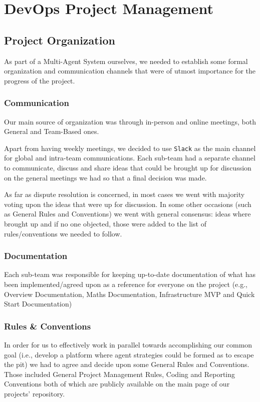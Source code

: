 \chapter{DevOps Project Management}\label{DevOps}

\section{Project Organization}

As part of a Multi-Agent System ourselves, we needed to establish some formal organization and communication channels that were of utmost importance for the progress of the project.

\subsection{Communication}

Our main source of organization was through in-person and online meetings, both General and Team-Based ones.

Apart from having weekly meetings, we decided to use \texttt{Slack} as the main channel for global and intra-team communications.
Each sub-team had a separate channel to communicate, discuss and share ideas that could be brought up for discussion on the general meetings we had so that a final decision was made.

As far as dispute resolution is concerned, in most cases we went with majority voting upon the ideas that were up for discussion. In some other occasions (such as General Rules and Conventions) we went with general consensus: ideas where brought up and if no one objected, those were added to the list of rules/conventions we needed to follow.

\subsection{Documentation}

Each sub-team was responsible for keeping up-to-date documentation of what has been implemented/agreed upon as a reference for everyone on the project (e.g., Overview Documentation, Maths Documentation, Infrastructure MVP and Quick Start Documentation)

\subsection{Rules \& Conventions}

In order for us to effectively work in parallel towards accomplishing our common goal (i.e., develop a platform where agent strategies could be formed as to escape the pit) we had to agree and decide upon some General Rules and Conventions.
Those included General Project Management Rules, Coding and Reporting Conventions both of which are publicly available on the main page of our projects' repository.

